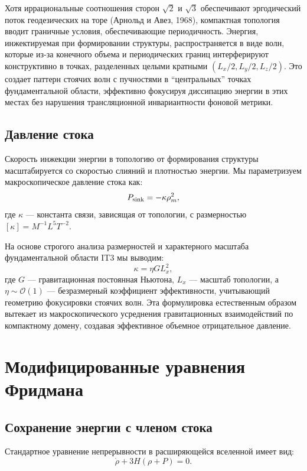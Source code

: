 \documentclass[12pt,a4paper]{article}
\begin{document}
Хотя иррациональные соотношения сторон $\sqrt{2}$ и $\sqrt{3}$ обеспечивают эргодический поток геодезических на торе (Арнольд и Авез, 1968), компактная топология вводит граничные условия, обеспечивающие периодичность. Энергия, инжектируемая при формировании структуры, распространяется в виде волн, которые из-за конечного объема и периодических границ интерферируют конструктивно в точках, разделенных целыми кратными $(L_x/2, L_y/2, L_z/2)$. Это создает паттерн стоячих волн с пучностями в ``центральных'' точках фундаментальной области, эффективно фокусируя диссипацию энергии в этих местах без нарушения трансляционной инвариантности фоновой метрики.

\subsection{Давление стока}

Скорость инжекции энергии в топологию от формирования структуры масштабируется со скоростью слияний и плотностью энергии. Мы параметризуем макроскопическое давление стока как:
\begin{equation}
P_{\rm sink} = -\kappa \rho_m^2,
\end{equation}
где $\kappa$ — константа связи, зависящая от топологии, с размерностью $[\kappa] = M^{-1} L^5 T^{-2}$.

На основе строгого анализа размерностей и характерного масштаба фундаментальной области IT3 мы выводим:
\begin{equation}
\kappa = \eta G L_x^2,
\end{equation}
где $G$ — гравитационная постоянная Ньютона, $L_x$ — масштаб топологии, а $\eta \sim \mathcal{O}(1)$ — безразмерный коэффициент эффективности, учитывающий геометрию фокусировки стоячих волн. Эта формулировка естественным образом вытекает из макроскопического усреднения гравитационных взаимодействий по компактному домену, создавая эффективное объемное отрицательное давление.

\section{Модифицированные уравнения Фридмана}

\subsection{Сохранение энергии с членом стока}

Стандартное уравнение непрерывности в расширяющейся вселенной имеет вид:
\begin{equation}
\dot{\rho} + 3H(\rho + P) = 0.
\end{equation}
\end{document}
